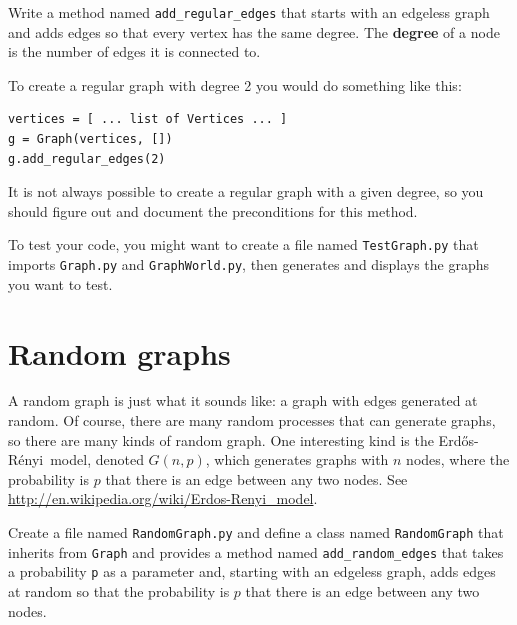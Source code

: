 \documentclass[10pt]{book}
\begin{document}
\begin{ex}

Write a method named \verb"add_regular_edges" that starts with an
edgeless graph and adds edges so that every vertex has the same
degree.  The {\bf degree} of a node is the number of edges it is
connected to.

To create a regular graph with degree 2 you would do something
like this:

\begin{verbatim}
vertices = [ ... list of Vertices ... ]
g = Graph(vertices, [])
g.add_regular_edges(2)
\end{verbatim} 

It is not always possible to create a regular graph
with a given degree, so you should figure out and document the
preconditions for this method.

To test your code, you might want to create a file named
{\tt TestGraph.py} that imports {\tt Graph.py} and
{\tt GraphWorld.py}, then generates and displays the graphs
you want to test.

\end{ex}


\newcommand{\Erdos}{Erd\H{o}s}
\newcommand{\Renyi}{R\'{e}nyi}

\section{Random graphs}

A random graph is just what it sounds like: a graph with edges
generated at random.  Of course, there are many random processes that
can generate graphs, so there are many kinds of random graph.  One
interesting kind is the \Erdos-\Renyi~model, denoted $G(n,p)$, which
generates graphs with $n$ nodes, where the probability is $p$ that
there is an edge between any two nodes.  See
\url{http://en.wikipedia.org/wiki/Erdos-Renyi_model}.

\begin{ex}
\label{ex.randomgraph}

Create a file named {\tt RandomGraph.py} and define a class named 
{\tt RandomGraph} that inherits from {\tt Graph} and provides a method
named \verb"add_random_edges" that takes a probability {\tt p} as a
parameter and, starting with an edgeless graph, adds edges at random
so that the probability is $p$ that there is an edge between any two
nodes.

\end{ex}
\end{document}
